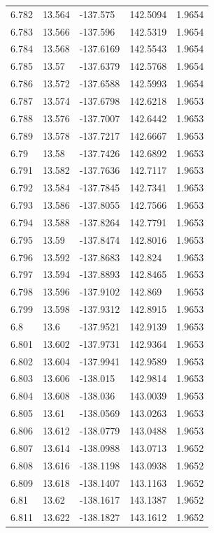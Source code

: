 \begin{tabular}{lllll}
6.782 & 13.564 & -137.575 & 142.5094 & 1.9654 \\
6.783 & 13.566 & -137.596 & 142.5319 & 1.9654 \\
6.784 & 13.568 & -137.6169 & 142.5543 & 1.9654 \\
6.785 & 13.57 & -137.6379 & 142.5768 & 1.9654 \\
6.786 & 13.572 & -137.6588 & 142.5993 & 1.9654 \\
6.787 & 13.574 & -137.6798 & 142.6218 & 1.9653 \\
6.788 & 13.576 & -137.7007 & 142.6442 & 1.9653 \\
6.789 & 13.578 & -137.7217 & 142.6667 & 1.9653 \\
6.79 & 13.58 & -137.7426 & 142.6892 & 1.9653 \\
6.791 & 13.582 & -137.7636 & 142.7117 & 1.9653 \\
6.792 & 13.584 & -137.7845 & 142.7341 & 1.9653 \\
6.793 & 13.586 & -137.8055 & 142.7566 & 1.9653 \\
6.794 & 13.588 & -137.8264 & 142.7791 & 1.9653 \\
6.795 & 13.59 & -137.8474 & 142.8016 & 1.9653 \\
6.796 & 13.592 & -137.8683 & 142.824 & 1.9653 \\
6.797 & 13.594 & -137.8893 & 142.8465 & 1.9653 \\
6.798 & 13.596 & -137.9102 & 142.869 & 1.9653 \\
6.799 & 13.598 & -137.9312 & 142.8915 & 1.9653 \\
6.8 & 13.6 & -137.9521 & 142.9139 & 1.9653 \\
6.801 & 13.602 & -137.9731 & 142.9364 & 1.9653 \\
6.802 & 13.604 & -137.9941 & 142.9589 & 1.9653 \\
6.803 & 13.606 & -138.015 & 142.9814 & 1.9653 \\
6.804 & 13.608 & -138.036 & 143.0039 & 1.9653 \\
6.805 & 13.61 & -138.0569 & 143.0263 & 1.9653 \\
6.806 & 13.612 & -138.0779 & 143.0488 & 1.9653 \\
6.807 & 13.614 & -138.0988 & 143.0713 & 1.9652 \\
6.808 & 13.616 & -138.1198 & 143.0938 & 1.9652 \\
6.809 & 13.618 & -138.1407 & 143.1163 & 1.9652 \\
6.81 & 13.62 & -138.1617 & 143.1387 & 1.9652 \\
6.811 & 13.622 & -138.1827 & 143.1612 & 1.9652 \\

\end{tabular}
